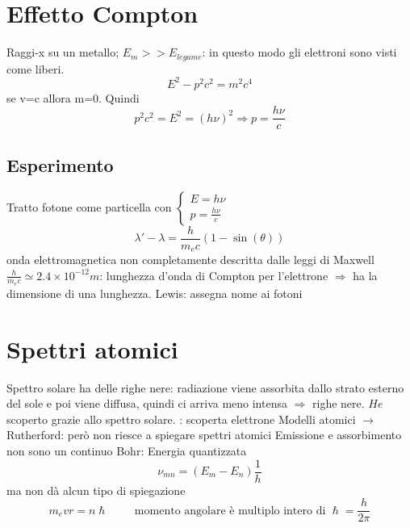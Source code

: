 \documentclass[a4paper,11pt]{report}
\theoremstyle{remark}
\theoremstyle{definition}
\begin{document}
\section{Effetto Compton}
Raggi-x su un metallo; $E_m >> E_{legame}$: in questo modo gli elettroni sono visti come liberi.
\begin{equation*}
    E^2 - p^2c^2 = m^2c^4
\end{equation*}
se v=c allora m=0. Quindi
\begin{equation*}
    p^2c^2 = E^2 = {(h\nu)}^2 \Rightarrow p=\frac{h\nu}{c}
\end{equation*}

\subsection*{Esperimento}
Tratto fotone come particella con 
$\begin{cases}
    E = h\nu \\
    p = \frac{h\nu}{c}
\end{cases}$
\begin{equation*}
    \lambda' - \lambda = \frac{h}{m_e c}(1 - \sin(\theta))
\end{equation*}
onda elettromagnetica non completamente descritta dalle leggi di Maxwell \newline
$\frac{h}{m_e c} \simeq 2.4 \times 10^{-12} m$: lunghezza d'onda di Compton per l'elettrone $\Rightarrow$ ha la dimensione di una lunghezza.  Lewis: assegna nome ai fotoni

\section{Spettri atomici}
Spettro solare ha delle righe nere: radiazione viene assorbita dallo strato esterno del sole e poi viene diffusa, quindi ci arriva meno intensa $\Rightarrow$ righe nere. $He$ scoperto grazie allo spettro solare. : scoperta elettrone \newline
Modelli atomici $\rightarrow$ Rutherford: però non riesce a spiegare spettri atomici \newline
Emissione e assorbimento non sono un continuo \newline
Bohr: Energia quantizzata
\begin{equation*}
    \nu_{mn} = (E_m - E_n)\frac{1}{h}
\end{equation*}
ma non dà alcun tipo di spiegazione
\begin{equation*}
    m_e v r = n \hslash \qquad \text{ momento angolare è multiplo intero di } \hslash = \frac{h}{2\pi}
\end{equation*}
\end{document}
